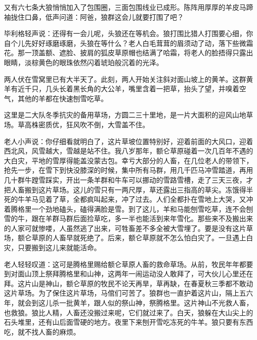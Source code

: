 \par 又有六七条大狼悄悄加入了包围圈，三面包围线业已成形。陈阵用厚厚的羊皮马蹄袖拢住口鼻，低声问道：阿爸，狼群这会儿就要打围了吧？
\par 毕利格轻声说：还得有一会儿呢，头狼还在等机会。狼打围比猎人打围要心细，你自个儿先好好琢磨琢磨，头狼在等什么？老人白毛茸茸的眉须动了动，落下些微霜花。那一顶盖额、遮脸、披肩的狐皮草原帽也结满了哈霜，将老人的脸捂得只露出眼睛，淡棕黄色的眼珠依然闪着琥珀般沉着的光泽。
\par 两人伏在雪窝里已有大半天了。此刻，两人开始关注斜对面山坡上的黄羊。这群黄羊有近千只，几头长着黑长角的大公羊，嘴里含着一把草，抬头了望，并嗅着空气，其他的羊都在快速刨雪吃草。
\par 这里是二大队冬季抗灾的备用草场，方圆二三十里地，是一片大面积的迎风山地草场。草高株密质优，狂风吹不倒，大雪盖不住。
\par 老人小声说：你仔细看就明白了，这片草坡位置特别好，迎着前面的大风口，迎着西北风，风雪越大，雪越是站不住。我八岁那年，额仑草原碰着一次几百年不遇的大白灾，平地的雪厚得能盖没蒙古包。幸亏大部分的人畜，在几位老人的带领下，抢先一步，在雪下到快没膝深的时候，集中所有马群，用几千匹马冲雪踏道，再用几十群牛蹚雪踩实，开出一条羊群和牛车可以挪动的雪路雪槽，走了三天三夜，才把人畜搬到这片草场。这儿的雪只有一两尺厚，草还露出三指高的草尖。冻饿得半死的牛羊马见着了草，全都疯叫起来，冲了过去。人们全都扑在雪地上大哭，又冲着腾格里一个劲地磕头，磕得满脸是雪。到了这儿，羊和马能刨雪吃草，连不会刨雪的牛，跟在羊群马群后面捡草吃，多一半也能活到来年雪化。那些来不及搬出来的人家可就惨喽，人虽然逃了出来，可牲畜差不多全被大雪埋了。要是没有这片草场，额仑草原的人畜早就死绝了。后来，额仑草原就不怎么怕白灾了。一旦遇上白灾，只要搬到这儿来就能活命。
\par 老人轻轻叹道：这可是腾格里赐给额仑草原人畜的救命草场。从前，牧民年年都要到对面山顶上祭拜腾格里和山神，这两年一闹运动没人敢拜了，可大伙儿心里还在拜。这片山是神山，额仑草原的牧民不论天再旱，草再缺，在春夏秋三季都不敢动这片草场。为了保住这片草场，马倌们可苦了。狼群也一直护着这片山，隔上五六年，就会到这儿杀一批黄羊，跟人似的祭山神，祭腾格里。这片神山不光救人畜，也救狼。狼比人精，人畜还没搬过来呢，它们就过来了。白天，狼躲在大山尖上的石头堆里，还有山后面雪硬的地方。夜里下来刨开雪吃冻死的牛羊。狼只要有东西吃，就不找人畜的麻烦。
